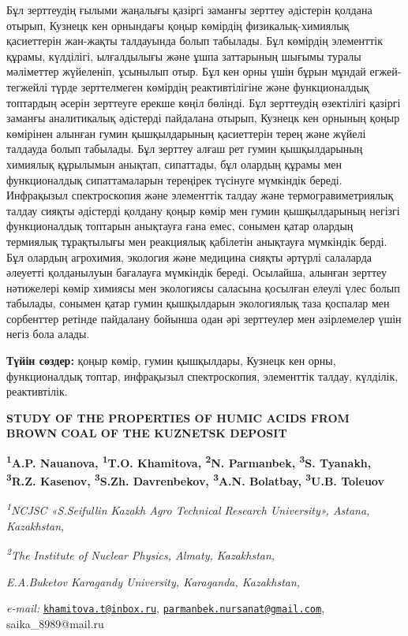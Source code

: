 Бұл зерттеудің ғылыми жаңалығы қазіргі заманғы зерттеу әдістерін қолдана
отырып, Кузнецк кен орнындағы қоңыр көмірдің физикалық-химиялық
қасиеттерін жан-жақты талдауында болып табылады. Бұл көмірдің элементтік
құрамы, күлділігі, ылғалдылығы және ұшпа заттарының шығымы туралы
мәліметтер жүйеленіп, ұсынылып отыр. Бұл кен орны үшін бұрын мұндай
егжей-тегжейлі түрде зерттелмеген көмірдің реактивтілігіне және
функционалдық топтардың әсерін зерттеуге ерекше көңіл бөлінді. Бұл
зерттеудің өзектілігі қазіргі заманғы аналитикалық әдістерді пайдалана
отырып, Кузнецк кен орнының қоңыр көмірінен алынған гумин қышқылдарының
қасиеттерін терең және жүйелі талдауда болып табылады. Бұл зерттеу алғаш
рет гумин қышқылдарының химиялық құрылымын анықтап, сипаттады, бұл
олардың құрамы мен функционалдық сипаттамаларын тереңірек түсінуге
мүмкіндік береді. Инфрақызыл спектроскопия және элементтік талдау және
термогравиметриялық талдау сияқты әдістерді қолдану қоңыр көмір мен
гумин қышқылдарының негізгі функционалдық топтарын анықтауға ғана емес,
сонымен қатар олардың термиялық тұрақтылығы мен реакциялық қабілетін
анықтауға мүмкіндік берді. Бұл олардың агрохимия, экология және медицина
сияқты әртүрлі салаларда әлеуетті қолданылуын бағалауға мүмкіндік
береді. Осылайша, алынған зерттеу нәтижелері көмір химиясы мен
экологиясы саласына қосылған елеулі үлес болып табылады, сонымен қатар
гумин қышқылдарын экологиялық таза қоспалар мен сорбенттер ретінде
пайдалану бойынша одан әрі зерттеулер мен әзірлемелер үшін негіз бола
алады.

{\bfseries Түйін сөздер:} қоңыр көмір, гумин қышқылдары, Кузнецк кен орны,
функционалдық топтар, инфрақызыл спектроскопия, элементтік талдау,
күлділік, реактивтілік.

\begin{articleheader}
{\bfseries STUDY OF THE PROPERTIES OF HUMIC ACIDS FROM BROWN COAL OF THE KUZNETSK DEPOSIT}

{\bfseries
\textsuperscript{1}A.P. Nauanova,
\textsuperscript{1}T.O. Khamitova\textsuperscript{\envelope },
\textsuperscript{2}N. Parmanbek\textsuperscript{\envelope },
\textsuperscript{3}S. Tyanakh\textsuperscript{\envelope },
\textsuperscript{3}R.Z. Kasenov,
\textsuperscript{3}S.Zh. Davrenbekov,
\textsuperscript{3}A.N. Bolatbay,
\textsuperscript{3}U.B. Toleuov}
\end{articleheader}

\begin{affiliation}
\emph{\textsuperscript{1}NCJSC «S.Seifullin Kazakh Agro Technical Research University», Astana, Kazakhstan,}

\emph{\textsuperscript{2}The Institute of Nuclear Physics, Almaty, Kazakhstan,}

\emph{E.A.Buketov Karagandy University, Karaganda, Kazakhstan,}

\emph{e-mail:} \href{mailto:khamitova.t@inbox.ru}{\nolinkurl{khamitova.t@inbox.ru}}, \href{mailto:parmanbek.nursanat@gmail.com}{\nolinkurl{parmanbek.nursanat@gmail.com}}, saika\_8989@mail.ru
\end{affiliation}

